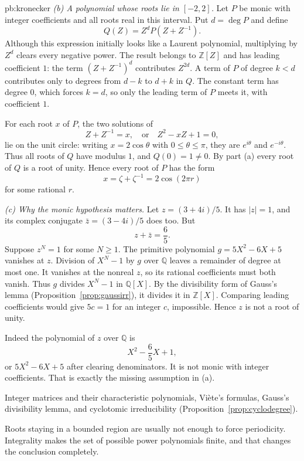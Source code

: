 \begin{solution}{pb:kronecker}
\emph{(b) A polynomial whose roots lie in $[-2,2]$.}
Let $P$ be monic with integer coefficients and all roots real in this interval. Put $d=\deg P$ and define
\[
Q(Z)=Z^dP(Z+Z^{-1}).
\]
Although this expression initially looks like a Laurent polynomial, multiplying by $Z^d$ clears every negative power. The result belongs to $\mathbb Z[Z]$ and has leading coefficient $1$: the term $(Z+Z^{-1})^d$ contributes $Z^{2d}$. A term of $P$ of degree $k<d$ contributes only to degrees from $d-k$ to $d+k$ in $Q$. The constant term has degree $0$, which forces $k=d$, so only the leading term of $P$ meets it, with coefficient $1$.

For each root $x$ of $P$, the two solutions of
\[
Z+Z^{-1}=x,\quad\text{or}\quad Z^2-xZ+1=0,
\]
lie on the unit circle: writing $x=2\cos\theta$ with $0\le\theta\le\pi$, they are $e^{i\theta}$ and $e^{-i\theta}$. Thus all roots of $Q$ have modulus $1$, and $Q(0)=1\ne0$. By part (a) every root of $Q$ is a root of unity. Hence every root of $P$ has the form
\[
x=\zeta+\zeta^{-1}=2\cos(2\pi r)
\]
for some rational $r$.

\emph{(c) Why the monic hypothesis matters.}
Let $z=(3+4i)/5$. It has $|z|=1$, and its complex conjugate $\bar z=(3-4i)/5$ does too. But
\[
z+\bar z=\frac65.
\]
Suppose $z^N=1$ for some $N\ge1$. The primitive polynomial
$g=5X^2-6X+5$ vanishes at $z$. Division of $X^N-1$ by $g$
over $\mathbb Q$ leaves a remainder of degree at most one. It vanishes
at the nonreal $z$, so its rational coefficients must both vanish.
Thus $g$ divides $X^N-1$ in $\mathbb Q[X]$. By the divisibility form
of Gauss's lemma (Proposition~\ref{prop:gaussirr}), it divides it in
$\mathbb Z[X]$. Comparing leading coefficients would give $5c=1$
for an integer $c$, impossible. Hence $z$ is not a root of unity.

Indeed the polynomial of $z$ over $\mathbb Q$ is
\[
X^2-\frac65X+1,
\]
or $5X^2-6X+5$ after clearing denominators. It is not monic with integer coefficients. That is exactly the missing assumption in (a).

\tools Integer matrices and their characteristic polynomials, Viète's formulas, Gauss's divisibility lemma, and cyclotomic irreducibility (Proposition~\ref{prop:cyclodegree}).

\leads Roots staying in a bounded region are usually not enough to force periodicity. Integrality makes the set of possible power polynomials finite, and that changes the conclusion completely.
\end{solution}

